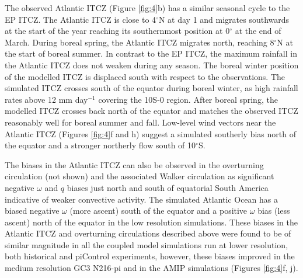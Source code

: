 The observed Atlantic ITCZ (Figure \ref{fig:4}b) has a similar seasonal cycle to the EP ITCZ.
The Atlantic ITCZ is close to 4$^\circ$N at day 1 and migrates southwards at the start of the year reaching  its southernmost position at 0$^\circ$ at the end of March.
During boreal spring, the Atlantic ITCZ migrates north, reaching 8$^\circ$N at the start of boreal summer. In contrast to the EP ITCZ, the maximum rainfall in the Atlantic ITCZ does not weaken during any season. 
The boreal winter position of the modelled ITCZ is displaced south with respect to the observations.
The simulated ITCZ  crosses south of the equator during boreal winter, as high rainfall rates above 12 mm day$^{-1}$ covering the 10S-0 region.
After boreal spring, the modelled ITCZ crosses back north of the equator and matches the observed ITCZ reasonably well for boreal summer and fall.
Low-level wind vectors near the Atlantic ITCZ (Figures \ref{fig:4}f and h) suggest a simulated southerly bias north of the equator and a stronger northerly flow south of 10$^\circ$S.




The biases in the Atlantic ITCZ can also be observed in the overturning circulation (not shown) and the associated Walker circulation as significant negative $\omega$ and $q$ biases just north and south of equatorial South America indicative of weaker convective activity. The simulated Atlantic Ocean has a biased negative $\omega$ (more ascent) south of the equator and a positive $\omega$ bias (less ascent) north of the equator in the low resolution simulations.
These biases in the Atlantic ITCZ and overturning circulations described above were found to be of similar magnitude in all the coupled model simulations run at lower resolution, both historical and piControl experiments,   however, these biases improved in the medium resolution GC3 N216-pi and in the AMIP simulations (Figures \ref{fig:4}f, j). 

